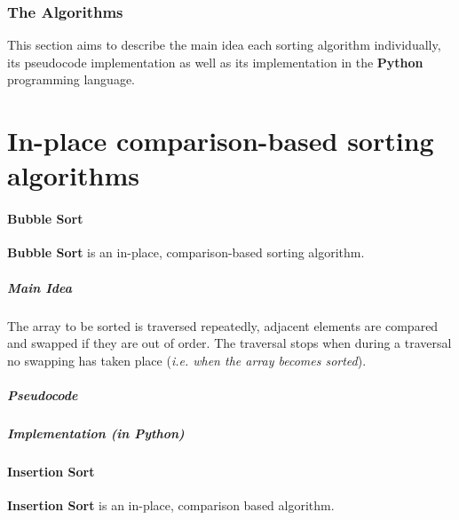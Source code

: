 \documentclass[a4paper]{article}
\begin{document}
    \section{The Algorithms}

        This section aims to describe the main idea each sorting algorithm individually,
        its pseudocode implementation as well as its implementation in the \textbf{Python} programming
        language.



        \part{In-place comparison-based sorting algorithms}

            \subsection{Bubble Sort}
                \textbf{Bubble Sort} is an in-place, comparison-based sorting algorithm.
                \subsubsection*{Main Idea}
                The array to be sorted is traversed repeatedly, 
                adjacent elements are compared and swapped if they are out of order. 
                The traversal stops when during a 
                traversal no swapping has taken place (\textit{i.e. when the array becomes sorted}).
                \subsubsection*{Pseudocode}
                \subsubsection*{Implementation (in Python)}

            \subsection{Insertion Sort}
                \textbf{Insertion Sort} is an in-place, comparison based algorithm.
\end{document}
